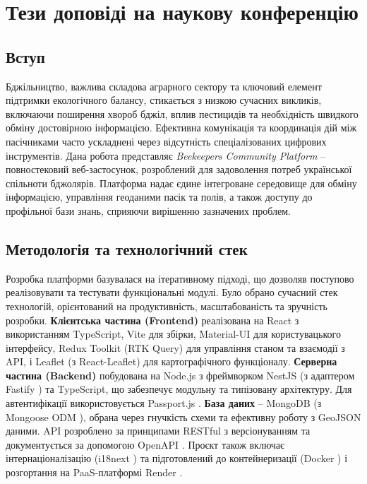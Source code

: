 \section*{Тези доповіді на наукову конференцію}
\label{sec:conference_abstract}

\subsection*{Вступ}
Бджільництво, важлива складова аграрного сектору та ключовий елемент підтримки екологічного балансу, стикається з низкою сучасних викликів, включаючи поширення хвороб бджіл, вплив пестицидів та необхідність швидкого обміну достовірною інформацією. Ефективна комунікація та координація дій між пасічниками часто ускладнені через відсутність спеціалізованих цифрових інструментів. Дана робота представляє \textit{Beekeepers Community Platform} – повностековий веб-застосунок, розроблений для задоволення потреб української спільноти бджолярів. Платформа надає єдине інтегроване середовище для обміну інформацією, управління геоданими пасік та полів, а також доступу до профільної бази знань, сприяючи вирішенню зазначених проблем.

\subsection*{Методологія та технологічний стек}
Розробка платформи базувалася на ітеративному підході, що дозволяв поступово реалізовувати та тестувати функціональні модулі. Було обрано сучасний стек технологій, орієнтований на продуктивність, масштабованість та зручність розробки. 
\textbf{Клієнтська частина (Frontend)} реалізована на React \cite{react} з використанням TypeScript, Vite \cite{vite} для збірки, Material-UI \cite{materialui} для користувацького інтерфейсу, Redux Toolkit (RTK Query) \cite{reduxtoolkit} для управління станом та взаємодії з API, і Leaflet \cite{leaflet} (з React-Leaflet) для картографічного функціоналу. 
\textbf{Серверна частина (Backend)} побудована на Node.js з фреймворком NestJS \cite{nestjs} (з адаптером Fastify \cite{fastify}) та TypeScript, що забезпечує модульну та типізовану архітектуру. Для автентифікації використовується Passport.js \cite{passportjs}.
\textbf{База даних} – MongoDB \cite{mongodb} (з Mongoose ODM \cite{mongoose}), обрана через гнучкість схеми та ефективну роботу з GeoJSON даними.
API розроблено за принципами RESTful з версіонуванням та документується за допомогою OpenAPI \cite{openapi}. Проєкт також включає інтернаціоналізацію (i18next \cite{i18next}) та підготовлений до контейнеризації (Docker \cite{docker}) і розгортання на PaaS-платформі Render \cite{renderpaas}.

